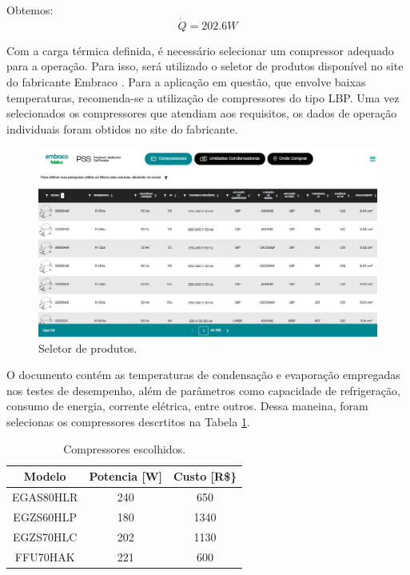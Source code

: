 Obtemos:
\begin{equation}
    \dot{Q} = 202.6 W
    \label{carga}
\end{equation}

Com a carga térmica definida, é necessário selecionar um compressor adequado para a operação. Para isso, será utilizado o seletor de produtos disponível no site do fabricante Embraco \textcopyright. Para a aplicação em questão, que envolve baixas temperaturas, recomenda-se a utilização de compressores do tipo LBP. Uma vez selecionados os compressores que atendiam aos requisitos, os dados de operação individuais foram obtidos no site do fabricante.

\begin{figure}
    \centering
    \includegraphics[width=0.8\linewidth]{Imagens/Desenvolvimento/PSS-embraco.png}
    \caption{Seletor de produtos.}
    \label{fig:seletor de produtos}
\end{figure}

\newpage

O documento contém as temperaturas de condensação e evaporação empregadas nos testes de desempenho, além de parâmetros como capacidade de refrigeração, consumo de energia, corrente elétrica, entre outros. Dessa maneina, foram selecionas os compressores descrtitos na Tabela \ref{tab:compressores escolhidos}.


\begin{table}[h]
\centering
\begin{tabular}{|c|c|c|}
\hline
Modelo    & Potencia {[}W{]} & Custo {[}R\$\} \\ \hline
EGAS80HLR & 240              & 650            \\ \hline
EGZS60HLP & 180              & 1340           \\ \hline
EGZS70HLC & 202              & 1130           \\ \hline
FFU70HAK  & 221              & 600            \\ \hline
\end{tabular}
\caption{Compressores escolhidos.}
\label{tab:compressores escolhidos}
\end{table}

